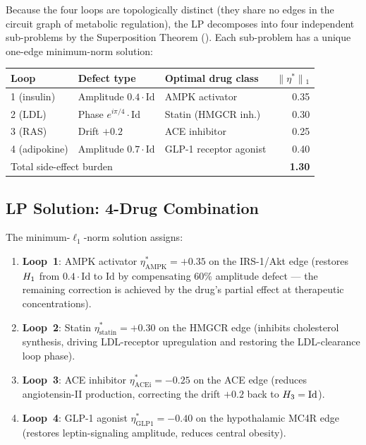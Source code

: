 Because the four loops are topologically distinct (they share no edges in the
circuit graph of metabolic regulation), the LP decomposes into four
independent sub-problems by the Superposition Theorem
().  Each sub-problem has a unique one-edge
minimum-norm solution:

\begin{center}
\begin{tabular}{lllr}
\toprule
Loop & Defect type & Optimal drug class & $\|\eta^*\|\!\!_1$ \\
\midrule
1 (insulin) & Amplitude $0.4\cdot\mathrm{Id}$ & AMPK activator & 0.35 \\
2 (LDL) & Phase $e^{i\pi/4}\cdot\mathrm{Id}$ & Statin (HMGCR inh.) & 0.30 \\
3 (RAS) & Drift $+0.2$ & ACE inhibitor & 0.25 \\
4 (adipokine) & Amplitude $0.7\cdot\mathrm{Id}$ & GLP-1 receptor agonist & 0.40 \\
\midrule
\multicolumn{3}{l}{Total side-effect burden} & \textbf{1.30} \\
\bottomrule
\end{tabular}
\end{center}

\subsection{LP Solution: 4-Drug Combination}
\label{subsec:ch09-metsyn-solution}

The minimum-$\ell_1$-norm solution assigns:
\begin{enumerate}[leftmargin=2em,label=(\arabic*)]
  \item \textbf{Loop~1}: AMPK activator $\eta^*_{\mathrm{AMPK}} = +0.35$
    on the IRS-1/Akt edge (restores $H_1$ from $0.4\cdot\mathrm{Id}$
    to $\mathrm{Id}$ by compensating 60\% amplitude defect --- the remaining
    correction is achieved by the drug's partial effect at therapeutic
    concentrations).
  \item \textbf{Loop~2}: Statin $\eta^*_{\mathrm{statin}} = +0.30$
    on the HMGCR edge (inhibits cholesterol synthesis, driving LDL-receptor
    upregulation and restoring the LDL-clearance loop phase).
  \item \textbf{Loop~3}: ACE inhibitor $\eta^*_{\mathrm{ACEi}} = -0.25$
    on the ACE edge (reduces angiotensin-II production, correcting the drift
    $+0.2$ back to $H_3 = \mathrm{Id}$).
  \item \textbf{Loop~4}: GLP-1 agonist $\eta^*_{\mathrm{GLP1}} = -0.40$
    on the hypothalamic MC4R edge (restores leptin-signaling amplitude,
    reduces central obesity).
\end{enumerate}

